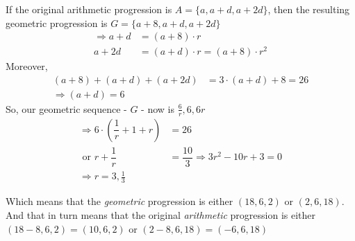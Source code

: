 \begin{solution}
	If the original arithmetic progression is $A = \lbrace a, a + d, a+2d\rbrace$, then the
	resulting geometric progression is $G = \lbrace a + 8, a + d, a + 2d \rbrace$
	\begin{align}
		\Rightarrow a +d &= (a+8)\cdot r \\
		a + 2d &= (a+d)\cdot r = (a + 8)\cdot r^2 
	\end{align}
	Moreover, 
	\begin{align}
		(a+8) + (a+d)+(a+2d) &= 3\cdot(a+d) + 8 = 26 \\
		\Rightarrow (a+d) = 6
	\end{align}
	So, our geometric sequence - $G$ - now is $\frac{6}{r}, 6, 6r$
	\begin{align}
		\Rightarrow 6\cdot\left( \dfrac{1}{r} + 1 + r\right) &= 26 \\
		\text{ or } r + \dfrac{1}{r} &= \dfrac{10}{3} \Rightarrow 3r^2-10r+3 = 0 \\
		\Rightarrow r = 3, \frac{1}{3}
	\end{align}
	
	Which means that the \textit{geometric} progression is either $(18,6,2)$ or $(2,6,18)$.
	And that in turn means that the original \textit{arithmetic} progression is either
	$(18-8,6,2) = (10,6,2)$ or $(2-8,6,18) = (-6,6,18)$
\end{solution}

